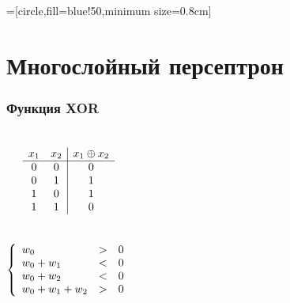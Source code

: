 \documentclass[24pt,pdf,hyperref={unicode}]{beamer}
\begin{document}
=[circle,fill=blue!50,minimum size=0.8cm]



\section{Многослойный персептрон}

\begin{frame}\frametitle{Функция XOR}
\begin{columns}
$$
\begin{array}{c c | c}
x_1 & x_2 & x_1\oplus x_2 \\
\hline
0 & 0 & 0 \\
0 & 1 & 1 \\
1 & 0 & 1 \\
1 & 1 & 0 \\
\end{array}
$$\\[1cm]
$$
\left\{
\begin{array}{l l l l l l}
 w_0       & > & 0 \\
 w_0 + w_1 & < & 0 \\
 w_0 + w_2 & < & 0 \\
 w_0 + w_1 + w_2 & > & 0 \\
\end{array}
\right.
$$
\end{columns}
\end{frame}
\end{document}
